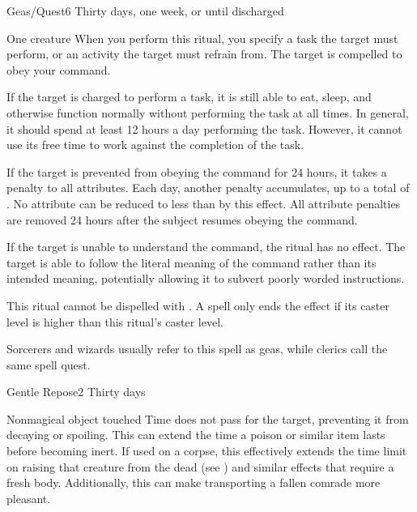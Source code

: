 \begin{spellsection}{Geas/Quest}{6}
\spellrng{\rngmed}
\spelldur Thirty days, one week, or until discharged \dismissable
\begin{spelltarget}{One creature}
    \spelleffect When you perform this ritual, you specify a task the target must perform, or an activity the target must refrain from. The target is compelled to obey your command.

    If the target is charged to perform a task, it is still able to eat, sleep, and otherwise function normally without performing the task at all times. In general, it should spend at least 12 hours a day performing the task. However, it cannot use its free time to work against the completion of the task.

    \par If the target is prevented from obeying the command for 24 hours, it takes a  penalty to all attributes. Each day, another  penalty accumulates, up to a total of . No attribute can be reduced to less than  by this effect. All attribute penalties are removed 24 hours after the subject resumes obeying the command.
\end{spelltarget}
\spellnotes If the target is unable to understand the command, the ritual has no effect. The target is able to follow the literal meaning of the command rather than its intended meaning, potentially allowing it to subvert poorly worded instructions.

\par This ritual cannot be dispelled with . A  spell only ends the effect if its caster level is higher than this ritual's caster level.

\par Sorcerers and wizards usually refer to this spell as geas, while clerics call the same spell quest.
\end{spellsection}

\begin{spellsection}{Gentle Repose}{2}
\spelldur Thirty days \dismissable
\begin{spelltarget}{Nonmagical object touched}
    \spelleffect Time does not pass for the target, preventing it from decaying or spoiling. This can extend the time a poison or similar item lasts before becoming inert. If used on a corpse, this effectively extends the time limit on raising that creature from the dead (see ) and similar effects that require a fresh body. Additionally, this can make transporting a fallen comrade more pleasant.
\end{spelltarget}
\end{spellsection}

